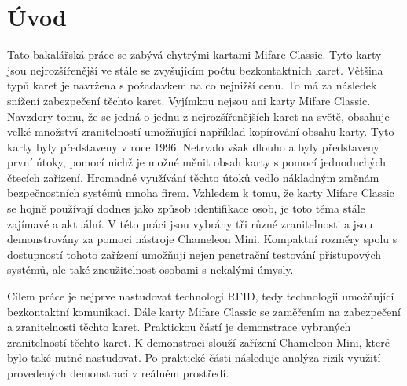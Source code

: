 \chapter{Úvod}
\label{uvod}
Tato bakalářská práce se zabývá chytrými kartami Mifare Classic. Tyto karty jsou nejrozšířenější ve stále se zvyšujícím počtu bezkontaktních karet. Většina typů karet je navržena s požadavkem na co nejnižší cenu. To má za následek snížení zabezpečení těchto karet. Vyjímkou nejsou ani karty Mifare Classic. Navzdory tomu, že se jedná o jednu z nejrozšířenějších karet na světě, obsahuje velké množství zranitelností umožňující například kopírování obsahu karty. Tyto karty byly představeny v roce 1996. Netrvalo však dlouho a byly představeny první útoky, pomocí nichž je možné měnit obsah karty s pomocí jednoduchých čtecích zařizení. Hromadné využívání těchto útoků vedlo nákladným změnám bezpečnostních systémů mnoha firem.  Vzhledem k tomu, že karty Mifare Classic se hojně používají dodnes jako způsob identifikace osob, je toto téma stále zajímavé a aktuální. V této práci jsou vybrány tři různé zranitelnosti a jsou demonstrovány za pomoci nástroje Chameleon Mini. Kompaktní rozměry spolu s dostupností tohoto zařízení umožňují nejen penetrační testování přístupových systémů, ale také zneužitelnost osobami s nekalými úmysly.\par
Cílem práce je nejprve nastudovat technologi RFID, tedy technologii umožňující bezkontaktní komunikaci. Dále karty Mifare Classic se zaměřením na zabezpečení a zranitelnosti těchto karet. Praktickou částí je demonstrace vybraných zranitelností těchto karet. K demonstraci slouží zařízení Chameleon Mini, které bylo také nutné nastudovat. Po praktické části následuje analýza rizik využití provedených demonstrací v reálném prostředí.
